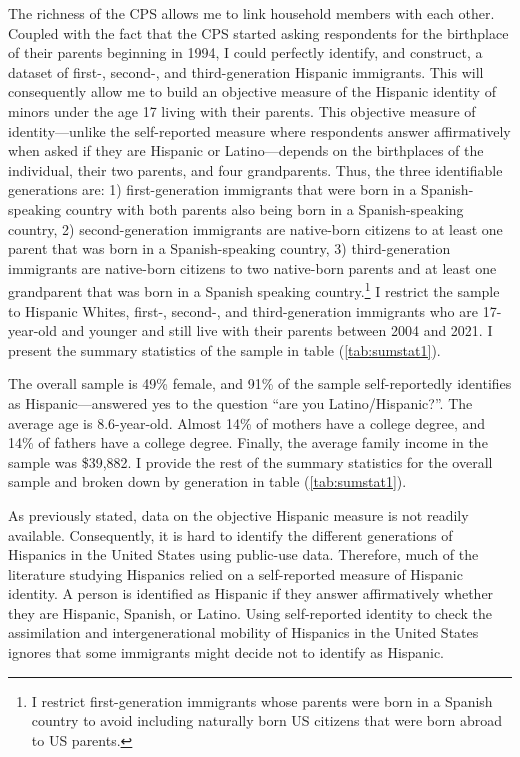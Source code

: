\documentclass[12pt, fullpage]{article}
\begin{document}
The richness of the CPS allows me to link household members with each other. Coupled with the fact that the CPS started asking respondents for the birthplace of their parents beginning in 1994, I could perfectly identify, and construct, a dataset of first-, second-, and third-generation Hispanic immigrants. This will consequently allow me to build an objective measure of the Hispanic identity of minors under the age 17 living with their parents. This objective measure of identity---unlike the self-reported measure where respondents answer affirmatively when asked if they are Hispanic or Latino---depends on the birthplaces of the individual, their two parents, and four grandparents. Thus, the three identifiable generations are: 1) first-generation immigrants that were born in a Spanish-speaking country with both parents also being born in a Spanish-speaking country, 2) second-generation immigrants are native-born citizens to at least one parent that was born in a Spanish-speaking country, 3) third-generation immigrants are native-born citizens to two native-born parents and at least one grandparent that was born in a Spanish speaking country.\footnote{I restrict first-generation immigrants whose parents were born in a Spanish country to avoid including naturally born US citizens that were born abroad to US parents.} I restrict the sample to Hispanic Whites, first-, second-, and third-generation immigrants who are 17-year-old and younger and still live with their parents between 2004 and 2021. I present the summary statistics of the sample in table (\ref{tab:sumstat1}). 

The overall sample is 49\% female, and 91\% of the sample self-reportedly identifies as Hispanic---answered yes to the question ``are you Latino/Hispanic?''. The average age is 8.6-year-old. Almost 14\% of mothers have a college degree, and 14\% of fathers have a college degree. Finally, the average family income in the sample was \$39,882. I provide the rest of the summary statistics for the overall sample and broken down by generation in table (\ref{tab:sumstat1}). 

As previously stated, data on the objective Hispanic measure is not readily available. Consequently, it is hard to identify the different generations of Hispanics in the United States using public-use data. Therefore, much of the literature studying Hispanics relied on a self-reported measure of Hispanic identity. A person is identified as Hispanic if they answer affirmatively whether they are Hispanic, Spanish, or Latino. Using self-reported identity to check the assimilation and intergenerational mobility of Hispanics in the United States ignores that some immigrants might decide not to identify as Hispanic. 
\end{document}
